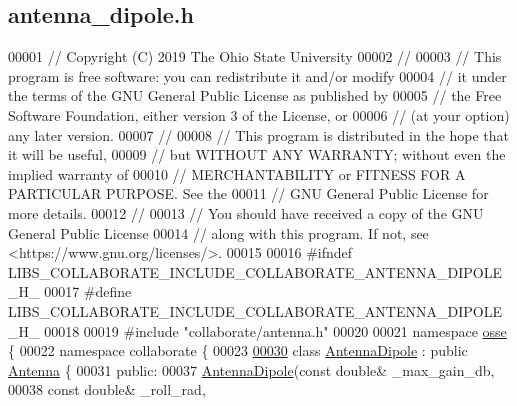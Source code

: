 \hypertarget{antenna__dipole_8h_source}{}\subsection{antenna\+\_\+dipole.\+h}
\label{antenna__dipole_8h_source}

\begin{DoxyCode}
00001 \textcolor{comment}{// Copyright (C) 2019 The Ohio State University}
00002 \textcolor{comment}{//}
00003 \textcolor{comment}{// This program is free software: you can redistribute it and/or modify}
00004 \textcolor{comment}{// it under the terms of the GNU General Public License as published by}
00005 \textcolor{comment}{// the Free Software Foundation, either version 3 of the License, or}
00006 \textcolor{comment}{// (at your option) any later version.}
00007 \textcolor{comment}{//}
00008 \textcolor{comment}{// This program is distributed in the hope that it will be useful,}
00009 \textcolor{comment}{// but WITHOUT ANY WARRANTY; without even the implied warranty of}
00010 \textcolor{comment}{// MERCHANTABILITY or FITNESS FOR A PARTICULAR PURPOSE.  See the}
00011 \textcolor{comment}{// GNU General Public License for more details.}
00012 \textcolor{comment}{//}
00013 \textcolor{comment}{// You should have received a copy of the GNU General Public License}
00014 \textcolor{comment}{// along with this program.  If not, see <https://www.gnu.org/licenses/>.}
00015 
00016 \textcolor{preprocessor}{#ifndef LIBS\_COLLABORATE\_INCLUDE\_COLLABORATE\_ANTENNA\_DIPOLE\_H\_}
00017 \textcolor{preprocessor}{#define LIBS\_COLLABORATE\_INCLUDE\_COLLABORATE\_ANTENNA\_DIPOLE\_H\_}
00018 
00019 \textcolor{preprocessor}{#include "collaborate/antenna.h"}
00020 
00021 \textcolor{keyword}{namespace }\hyperlink{namespaceosse}{osse} \{
00022 \textcolor{keyword}{namespace }collaborate \{
00023 
\hyperlink{classosse_1_1collaborate_1_1_antenna_dipole}{00030} \textcolor{keyword}{class }\hyperlink{classosse_1_1collaborate_1_1_antenna_dipole}{AntennaDipole} : \textcolor{keyword}{public} \hyperlink{classosse_1_1collaborate_1_1_antenna}{Antenna} \{
00031  \textcolor{keyword}{public}:
00037   \hyperlink{classosse_1_1collaborate_1_1_antenna_dipole_ab3146ec94f0d032743c5277d1f56b3d2}{AntennaDipole}(\textcolor{keyword}{const} \textcolor{keywordtype}{double}& \_max\_gain\_db,
00038                 \textcolor{keyword}{const} \textcolor{keywordtype}{double}& \_roll\_rad,

\end{DoxyCode}
